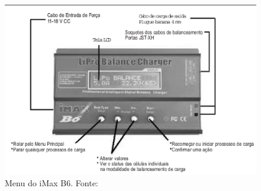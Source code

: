  \begin{figure}[h!]
    \centering
	\includegraphics[keepaspectratio=true,scale=0.5]{figuras/manual.eps}
    \caption{Menu do iMax B6. Fonte: \cite{ibmax}}
\end{figure}
